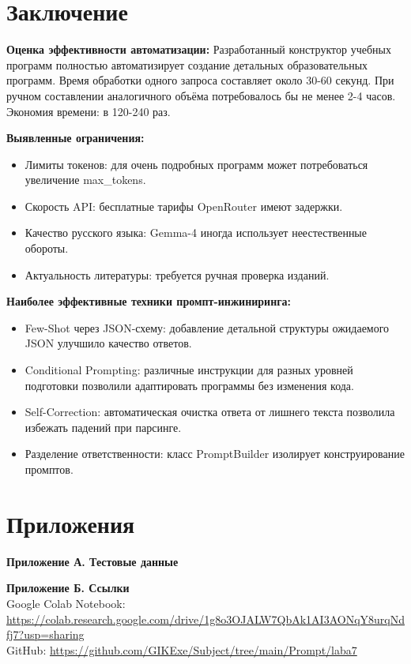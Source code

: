 \documentclass[oneside,a4paper,14pt]{extarticle} %
\begin{document}
\newpage
\section*{Заключение}
\noindent
\textbf{Оценка эффективности автоматизации:} Разработанный конструктор учебных программ полностью автоматизирует создание детальных образовательных программ. Время обработки одного запроса составляет около 30-60 секунд. При ручном составлении аналогичного объёма потребовалось бы не менее 2-4 часов. Экономия времени: в 120-240 раз.

\noindent
\textbf{Выявленные ограничения:}
\begin{itemize}
    \item Лимиты токенов: для очень подробных программ может потребоваться увеличение max\_tokens.
    \item Скорость API: бесплатные тарифы OpenRouter имеют задержки.
    \item Качество русского языка: Gemma-4 иногда использует неестественные обороты.
    \item Актуальность литературы: требуется ручная проверка изданий.
\end{itemize}

\noindent
\textbf{Наиболее эффективные техники промпт-инжиниринга:}
\begin{itemize}
    \item Few-Shot через JSON-схему: добавление детальной структуры ожидаемого JSON улучшило качество ответов.
    \item Conditional Prompting: различные инструкции для разных уровней подготовки позволили адаптировать программы без изменения кода.
    \item Self-Correction: автоматическая очистка ответа от лишнего текста позволила избежать падений при парсинге.
    \item Разделение ответственности: класс PromptBuilder изолирует конструирование промптов.
\end{itemize}

\section*{Приложения}
\noindent
\textbf{Приложение А. Тестовые данные}


\noindent
\textbf{Приложение Б. Ссылки} \\
Google Colab Notebook: \url{https://colab.research.google.com/drive/1g8o3OJALW7QbAk1AI3AONqY8urqNdfj7?usp=sharing} \\
GitHub: \url{https://github.com/GIKExe/Subject/tree/main/Prompt/laba7}
\end{document}
